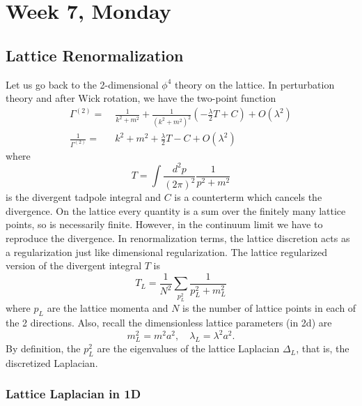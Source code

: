 \documentclass[12pt]{article}
\begin{document}
\newpage






\section{Week 7, Monday}

\subsection{Lattice Renormalization}

Let us go back to the 2-dimensional $\phi^4$ theory on the lattice.
In perturbation theory and after Wick rotation, we have the two-point
function
\begin{equation}
  \begin{split}
    \Gamma^{(2)} =&\; 
    \frac{1}{k^2+m^2} + 
    \frac{1}{(k^2+m^2)^2} 
    \left(
      -\frac{\lambda}{2} T + C
    \right)
    + O(\lambda^2)
    \\
    \frac{1}{\Gamma^{(2)}} =&\; 
    k^2 + m^2 + \frac{\lambda}{2}T - C
    + O(\lambda^2)
  \end{split}
\end{equation}
where 
\begin{equation}
  T = \int \frac{d^2p}{(2\pi)^2} 
  \frac{1}{p^2+m^2}
\end{equation}
is the divergent tadpole integral and $C$ is a counterterm which
cancels the divergence. On the lattice every quantity is a sum over
the finitely many lattice points, so is necessarily finite. However,
in the continuum limit we have to reproduce the divergence. In
renormalization terms, the lattice discretion acts as a regularization
just like dimensional regularization. The lattice regularized version of the
divergent integral $T$ is
\begin{equation}
  T_L = \frac{1}{N^2}
  \sum_{p_L^2} \frac{1}{p_L^2 + m_L^2}
\end{equation}
where $p_L$ are the lattice momenta and $N$ is the number of lattice
points in each of the 2 directions. Also, recall the dimensionless
lattice parameters (in 2d) are
\begin{equation}
  m^2_L = m^2 a^2
  ,\quad
  \lambda_L = \lambda^2 a^2
  .
\end{equation}
By definition, the $p_L^2$ are the eigenvalues of the lattice
Laplacian $\Delta_L$, that is, the discretized Laplacian.

\subsubsection{Lattice Laplacian in 1D}
\end{document}
